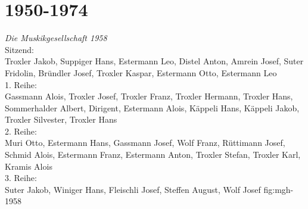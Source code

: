 \documentclass[]{book}
\begin{document}
\begin{figure}[ht]
{    }\hfil
\end{figure}

\clearpage

\section{1950-1974}

{\emph{Die Muskikgesellschaft 1958}\\
    Sitzend:\\
    Troxler Jakob, Suppiger Hans, Estermann Leo, Distel Anton, Amrein Josef,
    Suter Fridolin, Bründler Josef, Troxler Kaspar, Estermann Otto, Estermann
    Leo\\
    1. Reihe:\\
    Gassmann Alois, Troxler Josef, Troxler Franz, Troxler Hermann, Troxler Hans,
    Sommerhalder Albert, Dirigent, Estermann Alois, Käppeli Hans, Käppeli Jakob,
    Troxler Silvester, Troxler Hans\\
    2. Reihe:\\
    Muri Otto, Estermann Hans, Gassmann Josef, Wolf Franz, Rüttimann Josef,
    Schmid Alois, Estermann Franz, Estermann Anton, Troxler Stefan, Troxler
    Karl, Kramis Alois\\
    3. Reihe:\\
    Suter Jakob, Winiger Hans, Fleischli Josef, Steffen August, Wolf Josef
}
{fig:mgh-1958}
\end{document}
